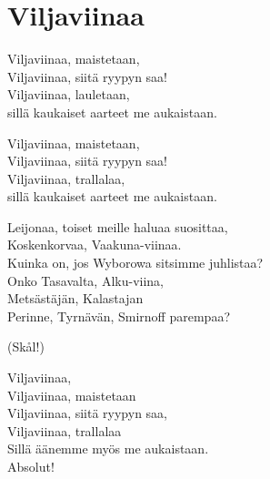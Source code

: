 \section{Viljaviinaa}
Viljaviinaa, maistetaan,\\
Viljaviinaa, siitä ryypyn saa!\\
Viljaviinaa, lauletaan,\\
sillä kaukaiset aarteet me aukaistaan.

Viljaviinaa, maistetaan,\\
Viljaviinaa, siitä ryypyn saa!\\
Viljaviinaa, trallalaa,\\
sillä kaukaiset aarteet me aukaistaan.

Leijonaa, toiset meille haluaa suosittaa,\\
Koskenkorvaa, Vaakuna-viinaa.\\
Kuinka on, jos Wyborowa sitsimme juhlistaa?\\
Onko Tasavalta, Alku-viina,\\
Metsästäjän, Kalastajan\\
Perinne, Tyrnävän, Smirnoff parempaa?

(Skål!)

Viljaviinaa,\\
Viljaviinaa, maistetaan\\
Viljaviinaa, siitä ryypyn saa,\\
Viljaviinaa, trallalaa\\
Sillä äänemme myös me aukaistaan.\\
Absolut!